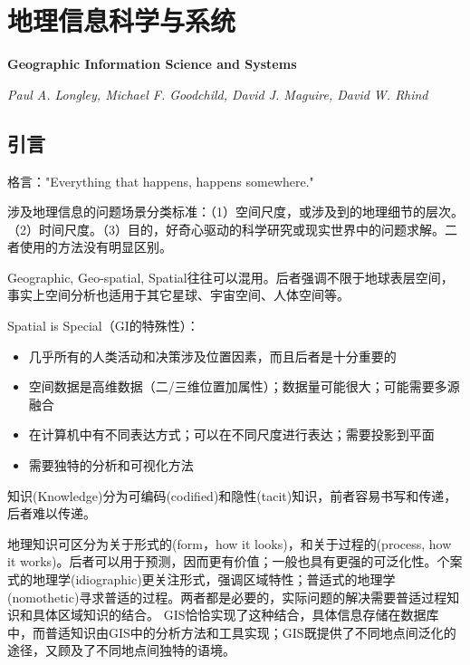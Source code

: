 
\chapter{地理信息科学与系统}
\Large\textbf{Geographic Information Science and Systems}
\par \emph{Paul A. Longley, Michael F. Goodchild, David J. Maguire, David W. Rhind} \normalsize

\section{引言}

\par 格言："Everything that happens, happens somewhere."

\par 涉及地理信息的问题场景分类标准：（1）空间尺度，或涉及到的地理细节的层次。（2）时间尺度。（3）目的，好奇心驱动的科学研究或现实世界中的问题求解。二者使用的方法没有明显区别。

\par Geographic, Geo-spatial, Spatial往往可以混用。后者强调不限于地球表层空间，事实上空间分析也适用于其它星球、宇宙空间、人体空间等。

\par Spatial is Special（GI的特殊性）：
\begin{itemize}
    \item 几乎所有的人类活动和决策涉及位置因素，而且后者是十分重要的
    \item 空间数据是高维数据（二/三维位置加属性）；数据量可能很大；可能需要多源融合
    \item 在计算机中有不同表达方式；可以在不同尺度进行表达；需要投影到平面
    \item 需要独特的分析和可视化方法
\end{itemize}

\par 知识(Knowledge)分为可编码(codified)和隐性(tacit)知识，前者容易书写和传递，后者难以传递。

\par 地理知识可区分为关于形式的(form，how it looks)，和关于过程的(process, how it works)。后者可以用于预测，因而更有价值；一般也具有更强的可泛化性。个案式的地理学(idiographic)更关注形式，强调区域特性；普适式的地理学(nomothetic)寻求普适的过程。两者都是必要的，实际问题的解决需要普适过程知识和具体区域知识的结合。 GIS恰恰实现了这种结合，具体信息存储在数据库中，而普适知识由GIS中的分析方法和工具实现；GIS既提供了不同地点间泛化的途径，又顾及了不同地点间独特的语境。

